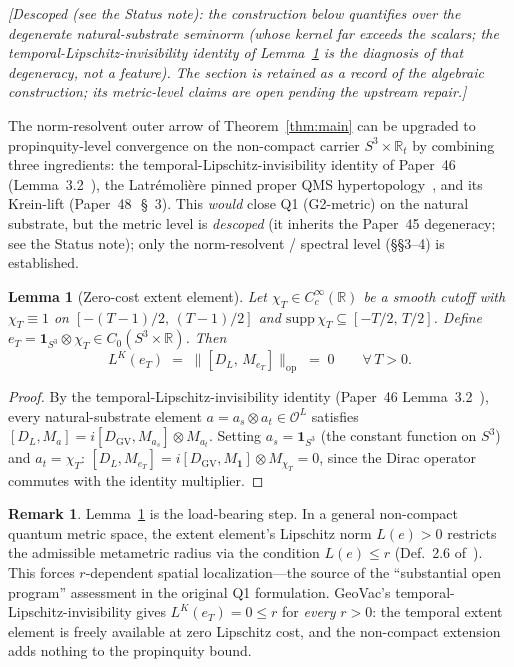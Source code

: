 \documentclass[11pt,a4paper]{article}
\theoremstyle{plain}
\newtheorem{lemma}[theorem]{Lemma}
\theoremstyle{definition}
\newtheorem{remark}[theorem]{Remark}
\newcommand{\sthree}{S^{3}}
\newcommand{\Op}{\mathcal{O}}
\newcommand{\opnorm}[1]{\lVert #1 \rVert_{\mathrm{op}}}
\newcommand{\R}{\mathbb{R}}
\newcommand{\DGV}{D_{\mathrm{GV}}}
\newcommand{\DL}{D_{L}}
\begin{document}
\emph{[Descoped (see the Status note): the construction below
quantifies over the degenerate natural-substrate seminorm (whose
kernel far exceeds the scalars; the temporal-Lipschitz-invisibility
identity of Lemma~\ref{lem:extent_zero} is the diagnosis of that
degeneracy, not a feature). The section is retained as a record of
the algebraic construction; its metric-level claims are open pending
the upstream repair.]}

The norm-resolvent outer arrow of Theorem~\ref{thm:main} can be
upgraded to propinquity-level convergence on the non-compact carrier
$\sthree \times \R_{t}$ by combining three ingredients: the
temporal-Lipschitz-invisibility identity of Paper~46
(Lemma~3.2~\cite{paper46}), the Latr\'emoli\`ere pinned proper QMS
hypertopology~\cite{latremoliere2025_hypertopology}, and its
Krein-lift (Paper~48~\cite{paper48}\,\S~3). This \emph{would} close Q1
(G2-metric) on the natural substrate, but the metric level is
\emph{descoped} (it inherits the Paper~45 degeneracy; see the Status
note); only the norm-resolvent / spectral level (\S\S 3--4) is established.

\begin{lemma}[Zero-cost extent element]\label{lem:extent_zero}
Let $\chi_{T} \in C_{c}^{\infty}(\R)$ be a smooth cutoff with
$\chi_{T} \equiv 1$ on $[-(T{-}1)/2,\,(T{-}1)/2]$ and
$\mathrm{supp}\,\chi_{T} \subseteq [-T/2,\,T/2]$.
Define $e_{T} = \mathbf{1}_{S^{3}} \otimes \chi_{T}
\in C_{0}(\sthree \times \R)$. Then
\begin{equation}\label{eq:extent_zero}
   L^{K}(e_{T}) \;=\; \opnorm{[\DL,\, M_{e_{T}}]} \;=\; 0
   \qquad \forall\, T > 0.
\end{equation}
\end{lemma}

\begin{proof}
By the temporal-Lipschitz-invisibility identity (Paper~46
Lemma~3.2~\cite{paper46}), every natural-substrate element
$a = a_{s} \otimes a_{t} \in \Op^{L}$ satisfies
$[\DL, M_{a}] = i[\DGV, M_{a_{s}}] \otimes M_{a_{t}}$.
Setting $a_{s} = \mathbf{1}_{S^{3}}$ (the constant function on $S^{3}$)
and $a_{t} = \chi_{T}$:
$[\DL, M_{e_{T}}] = i[\DGV, M_{\mathbf{1}}] \otimes M_{\chi_{T}} = 0$,
since the Dirac operator commutes with the identity multiplier.
\end{proof}

\begin{remark}\label{rem:extent_mechanism}
Lemma~\ref{lem:extent_zero} is the load-bearing step. In a general
non-compact quantum metric space, the extent element's Lipschitz
norm $L(e) > 0$ restricts the admissible metametric radius via the
condition $L(e) \le r$ (Def.~2.6 of~\cite{latremoliere2025_hypertopology}).
This forces $r$-dependent spatial localization---the source of the
``substantial open program'' assessment in the original Q1
formulation. GeoVac's
temporal-Lipschitz-invisibility gives $L^{K}(e_{T}) = 0 \le r$ for
\emph{every} $r > 0$: the temporal extent element is freely available
at zero Lipschitz cost, and the non-compact extension adds nothing
to the propinquity bound.
\end{remark}
\end{document}
